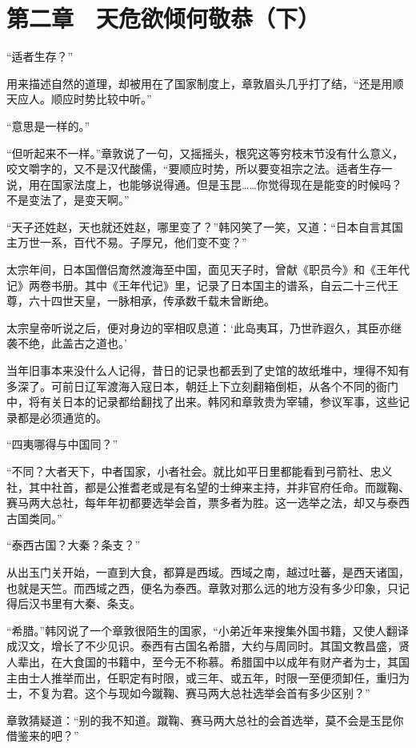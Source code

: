 \section{第二章　天危欲倾何敬恭（下）}

“适者生存？”

用来描述自然的道理，却被用在了国家制度上，章敦眉头几乎打了结，“还是用顺天应人。顺应时势比较中听。”

“意思是一样的。”

“但听起来不一样。”章敦说了一句，又摇摇头，根究这等穷枝末节没有什么意义，咬文嚼字的，又不是汉代酸儒，“要顺应时势，所以要变祖宗之法。适者生存一说，用在国家法度上，也能够说得通。但是玉昆……你觉得现在是能变的时候吗？不是变法了，是变天啊。”

“天子还姓赵，天也就还姓赵，哪里变了？”韩冈笑了一笑，又道：“日本自言其国主万世一系，百代不易。子厚兄，他们变不变？”

太宗年间，日本国僧侣奝然渡海至中国，面见天子时，曾献《职员今》和《王年代记》两卷书册。其中《王年代记》里，记录了日本国主的谱系，自云二十三代王尊，六十四世天皇，一脉相承，传承数千载未曾断绝。

太宗皇帝听说之后，便对身边的宰相叹息道：‘此岛夷耳，乃世祚遐久，其臣亦继袭不绝，此盖古之道也。’

当年旧事本来没什么人记得，昔日的记录也都丢到了史馆的故纸堆中，埋得不知有多深了。可前日辽军渡海入寇日本，朝廷上下立刻翻箱倒柜，从各个不同的衙门中，将有关日本的记录都给翻找了出来。韩冈和章敦贵为宰辅，参议军事，这些记录都是必须通览的。

“四夷哪得与中国同？”

“不同？大者天下，中者国家，小者社会。就比如平日里都能看到弓箭社、忠义社，其中社首，都是公推耆老或是有名望的士绅来主持，并非官府任命。而蹴鞠、赛马两大总社，每年年初都要选举会首，票多者为胜。这一选举之法，却又与泰西古国类同。”

“泰西古国？大秦？条支？”

从出玉门关开始，一直到大食，都算是西域。西域之南，越过吐蕃，是西天诸国，也就是天竺。而西域之西，便名为泰西。章敦对那么远的地方没有多少印象，只记得后汉书里有大秦、条支。

“希腊。”韩冈说了一个章敦很陌生的国家，“小弟近年来搜集外国书籍，又使人翻译成汉文，增长了不少见识。泰西有古国名希腊，大约与周同时。其国文教昌盛，贤人辈出，在大食国的书籍中，至今无不称慕。希腊国中以成年有财产者为士，其国主由士人推举而出，任职定有时限，或三年、或五年，时限一至便须卸任，重归为士，不复为君。这个与现如今蹴鞠、赛马两大总社选举会首有多少区别？”

章敦猜疑道：“别的我不知道。蹴鞠、赛马两大总社的会首选举，莫不会是玉昆你借鉴来的吧？”


